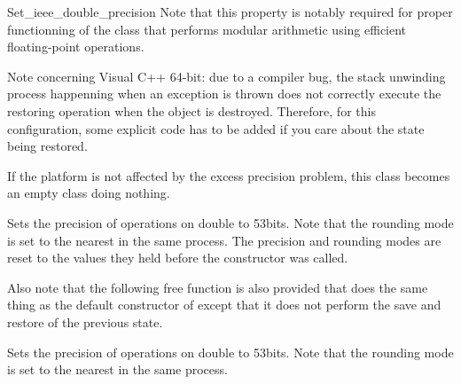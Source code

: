 \begin{ccRefClass}{Set_ieee_double_precision}
Note that this property is notably required for proper functionning of the
 class that performs modular arithmetic using efficient
floating-point operations.

Note concerning Visual C++ 64-bit: due to a compiler bug, the stack unwinding
process happenning when an exception is thrown does not correctly execute the
restoring operation when the  object is
destroyed.  Therefore, for this configuration, some explicit code has to be
added if you care about the state being restored.


\ccCreation

If the platform is not affected by the excess precision problem, this class
becomes an empty class doing nothing.

{Sets the precision of operations on double to 53bits.
Note that the rounding mode is set to the nearest in the same process.}
\ccGlue
{}
{The precision and rounding modes are reset to the values they held before the
constructor was called.}


Also note that the following free function is also provided that does the same
thing as the default constructor of  except that
it does not perform the save and restore of the previous state.

{
Sets the precision of operations on double to 53bits.
Note that the rounding mode is set to the nearest in the same process.
}

\ccSeeAlso
{}\\

\end{ccRefClass}
